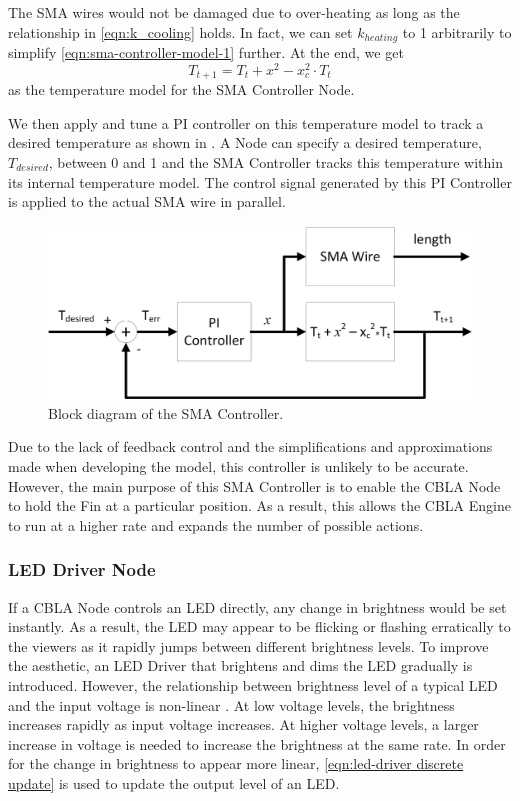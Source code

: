 The SMA wires would not be damaged due to over-heating as long as the relationship in \eqref{eqn:k_cooling} holds. In fact, we can set $k_{heating}$ to 1 arbitrarily to simplify \eqref{eqn:sma-controller-model-1} further. At the end, we get
\begin{equation}\label{eqn:sma-controller-model-2}
T_{t+1} =  T_{t} + x^2 -  x_c^2 \cdot T_{t}
\end{equation}
as the temperature model for the SMA Controller Node.

We then apply and tune a PI controller on this temperature model to track a desired temperature as shown in . A Node can specify a desired temperature, $T_{desired}$, between 0 and 1 and the SMA Controller tracks this temperature within its internal temperature model. The control signal generated by this PI Controller is applied to the actual SMA wire in parallel. 

\begin{figure} [htb]
	\centering
	\includegraphics[width=1.0\textwidth]{"fig/validations/SMA Controller"}
	\caption[Block diagram of the SMA Controller]{Block diagram of the SMA Controller. }
	\label{fig:SMA Controller}
\end{figure}

Due to the lack of feedback control and the simplifications and approximations made when developing the model, this controller is unlikely to be accurate. However, the main purpose of this SMA Controller is to enable the CBLA Node to hold the Fin at a particular position. As a result, this allows the CBLA Engine to run at a higher rate and expands the number of possible actions. 


\subsubsection{LED Driver Node}

If a CBLA Node controls an LED directly, any change in brightness would be set instantly. As a result, the LED may appear to be flicking or flashing erratically to the viewers as it rapidly jumps between different brightness levels. To improve the aesthetic, an LED Driver that brightens and dims the LED gradually is introduced. However, the relationship between brightness level of a typical LED and the input voltage is non-linear \cite{Cree2011}. At low voltage levels, the brightness increases rapidly as input voltage increases. At higher voltage levels, a larger increase in voltage is needed to increase the brightness at the same rate. In order for the change in brightness to appear more linear, \eqref{eqn:led-driver discrete update} is used to update the output level of an LED. 

